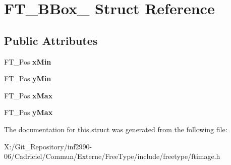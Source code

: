 \hypertarget{struct_f_t___b_box__}{\section{F\-T\-\_\-\-B\-Box\-\_\- Struct Reference}
\label{struct_f_t___b_box__}
}
\subsection*{Public Attributes}
\begin{DoxyCompactItemize}
\item 
\hypertarget{struct_f_t___b_box___a1f2a5d0565d496c1d41e43d018f45add}{F\-T\-\_\-\-Pos {\bfseries x\-Min}}\label{struct_f_t___b_box___a1f2a5d0565d496c1d41e43d018f45add}

\item 
\hypertarget{struct_f_t___b_box___a959ca1d5bc1c5338da0d85c8e7135f4e}{F\-T\-\_\-\-Pos {\bfseries y\-Min}}\label{struct_f_t___b_box___a959ca1d5bc1c5338da0d85c8e7135f4e}

\item 
\hypertarget{struct_f_t___b_box___ac6da5c44f4cb7b97eef1f438eb69c0ec}{F\-T\-\_\-\-Pos {\bfseries x\-Max}}\label{struct_f_t___b_box___ac6da5c44f4cb7b97eef1f438eb69c0ec}

\item 
\hypertarget{struct_f_t___b_box___a77084921589f386a8a593ae1f25b1569}{F\-T\-\_\-\-Pos {\bfseries y\-Max}}\label{struct_f_t___b_box___a77084921589f386a8a593ae1f25b1569}

\end{DoxyCompactItemize}


The documentation for this struct was generated from the following file\-:\begin{DoxyCompactItemize}
\item 
X\-:/\-Git\-\_\-\-Repository/inf2990-\/06/\-Cadriciel/\-Commun/\-Externe/\-Free\-Type/include/freetype/ftimage.\-h\end{DoxyCompactItemize}
